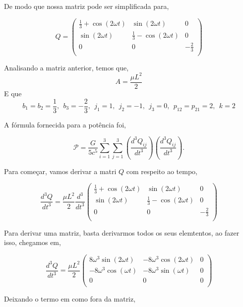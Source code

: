 \documentclass[11pt]{article}
\begin{document}
\begin{pproblem}
\begin{pssolution*}{}{}
\begin{alternativas}
        De modo que nossa matriz pode ser simplificada para, 


        \[\boxed{Q = \left(\begin{matrix}
            \frac{1}{3}+\cos(2\omega t) & \sin(2\omega t) & 0 \\
            \sin(2\omega t) & \frac{1}{3} - \cos(2\omega t) & 0 \\
            0 & 0 & -\frac{2}{3} \\
        \end{matrix}\right)}\]

        \item Analisando a matriz anterior, temos que, 
        \[\boxed{A = \frac{\mu L^2}{2}}\]
        E que
        \[\boxed{b_1 = b_2 = \frac{1}{3}, \ \ b_3 = -\frac{2}{3}, \ \ j_1 = 1, \ \ j_2 = -1, \ \ j_3 = 0, \ \ p_{12}=p_{21} = 2, \ \ k= 2}\]

        \item A fórmula fornecida para a potência foi, 
        
        \[
        \mathcal{P} = \frac{G}{5c^5} \sum_{i=1}^3 \sum_{j=1}^3 \left( \frac{d^3 Q_{ij}}{dt^3} \right) \left( \frac{d^3 Q_{ij}}{dt^3} \right).
        \]

        Para começar, vamos derivar a matri \(Q\) com respeito ao tempo, 

        \[\frac{d^3 Q}{dt^3} = \frac{\mu L^2}{2}\frac{d^3}{dt^3}\left(\begin{matrix}
            \frac{1}{3}+\cos(2\omega t) & \sin(2\omega t) & 0 \\
            \sin(2\omega t) & \frac{1}{3} - \cos(2\omega t) & 0 \\
            0 & 0 & -\frac{2}{3} \\
        \end{matrix}\right)\]

        Para derivar uma matriz, basta derivarmos todos os seus elemtentos, ao fazer isso, chegamos em, 

        \[\frac{d^3Q}{dt^3} = \frac{\mu L^2}{2}\left(\begin{matrix}
            8\omega^3 \sin(2\omega t) & -8\omega ^3\cos(2\omega t) & 0 \\
            -8\omega^3\cos(\omega t) & -8\omega^3\sin(\omega t) & 0 \\
            0 & 0 & 0 \\ 
        \end{matrix}\right)\]

        Deixando o termo em como fora da matriz, 


\end{alternativas}
\end{pssolution*}
\end{pproblem}
\end{document}
